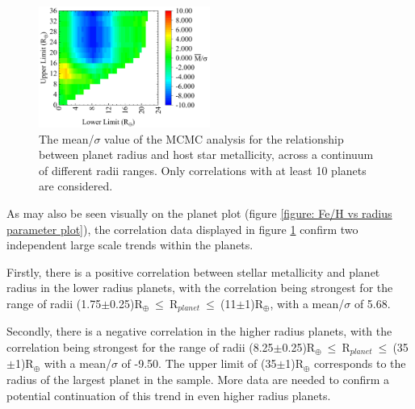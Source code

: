 \documentclass[a4paper,twocolumn,12pt]{article}
\begin{document}
\begin{figure}[h!]
    \centering
    \includegraphics[width=0.5\textwidth]{Graphs/FeH vs Radius correlations - Radii ranges.pdf}
    \caption{The mean/$\sigma$ value of the MCMC analysis for the relationship between planet radius and host star metallicity, across a continuum of different radii ranges. Only correlations with at least 10 planets are considered.}
    \label{figure: Fe/H vs Radius correlations - Radii ranges}
\end{figure}

As may also be seen visually on the planet plot (figure \ref{figure: Fe/H vs radius parameter plot}), the correlation data displayed in figure \ref{figure: Fe/H vs Radius correlations - Radii ranges} confirm two independent large scale trends within the planets.

Firstly, there is a positive correlation between stellar metallicity and planet radius in the lower radius planets, with the correlation being strongest for the range of radii (1.75$\pm$0.25)R$_{\oplus}~\leq~$R$_{planet}~\leq~$(11$\pm$1)R$_{\oplus}$, with a mean/$\sigma$ of 5.68. %

Secondly, there is a negative correlation in the higher radius planets, with the correlation being strongest for the range of radii (8.25$\pm$0.25)R$_{\oplus}~\leq~$R$_{planet}~\leq~$(35$\pm$1)R$_{\oplus}$ with a mean/$\sigma$ of -9.50. %
The upper limit of (35$\pm$1)R$_{\oplus}$ corresponds to the radius of the largest planet in the sample. More data are needed to confirm a potential continuation of this trend in even higher radius planets.


\end{document}
